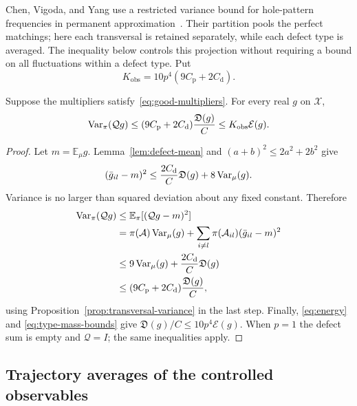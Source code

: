 Chen, Vigoda, and Yang use a restricted variance bound for hole-pattern
frequencies in permanent approximation~\cite[Theorem~5 and
Lemma~12]{CVY2026}. Their partition pools the perfect matchings;
here each transversal is retained separately, while each defect type
is averaged. The inequality below controls this projection without
requiring a bound on all fluctuations within a defect type.
Put
\begin{equation}
  K_{\mathrm{obs}}=10p^4(9C_{\mathrm p}+2C_{\mathrm d}).
  \label{eq:observable-constant}
\end{equation}

\begin{proposition}
\label{prop:observable-variance}
Suppose the multipliers satisfy~\eqref{eq:good-multipliers}.
For every real $g$ on $\mathcal X$,
\begin{equation}
 \operatorname{Var}_\pi(\mathcal Qg)
 \leq(9C_{\mathrm p}+2C_{\mathrm d})\frac{\mathfrak D(g)}{C}
 \leq K_{\mathrm{obs}}\mathcal E(g).
 \label{eq:observable-variance}
\end{equation}
\end{proposition}

\begin{proof}
Let $m=\mathbb E_\mu g$.
Lemma~\ref{lem:defect-mean} and $(a+b)^2\leq2a^2+2b^2$ give
\[
  (\bar g_{il}-m)^2
  \leq\frac{2C_{\mathrm d}}{C}\mathfrak D(g)
       +8\operatorname{Var}_\mu(g).
\]
Variance is no larger than squared deviation about any fixed
constant. Therefore
\begin{align*}
 \operatorname{Var}_\pi(\mathcal Qg)
 &\leq\mathbb E_\pi[(\mathcal Qg-m)^2]\\
 &=\pi(\mathcal A)\operatorname{Var}_\mu(g)
       +\sum_{i\ne l}\pi(\mathcal A_{il})(\bar g_{il}-m)^2\\
 &\leq9\operatorname{Var}_\mu(g)+\frac{2C_{\mathrm d}}{C}\mathfrak D(g)\\
 &\leq(9C_{\mathrm p}+2C_{\mathrm d})\frac{\mathfrak D(g)}{C},
\end{align*}
using Proposition~\ref{prop:transversal-variance} in the last step.
Finally, \eqref{eq:energy} and \eqref{eq:type-mass-bounds} give
$\mathfrak D(g)/C\leq10p^4\mathcal E(g)$.
When $p=1$ the defect sum is empty and $\mathcal Q=I$; the same
inequalities apply.
\end{proof}

\subsection{Trajectory averages of the controlled observables}

